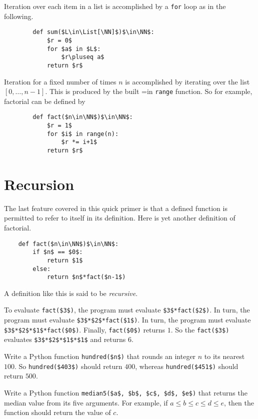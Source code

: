 Iteration over each item in a list is accomplished by a \lstinline|for| loop as in the following.

\begin{code}
	\begin{lstlisting}
		def sum($L\in\List[\NN]$)$\in\NN$:
			$r = 0$
			for $a$ in $L$:
				$r\pluseq a$
			return $r$ 
	\end{lstlisting}
\end{code}

Iteration for a fixed number of times $n$ is accomplished by iterating over the list $[0,\dotsc,n-1]$. This is produced by the built =in \lstinline|range| function. So for example, factorial can be defined by

\begin{code}
	\begin{lstlisting}
		def fact($n\in\NN$)$\in\NN$:
			$r = 1$
			for $i$ in range(n):
				$r *= i+1$
			return $r$ 
	\end{lstlisting}
\end{code}

\ipadbreak

\section{Recursion}

The last feature covered in this quick primer is that a defined function is permitted to refer to itself in its definition.  Here is yet another
definition of factorial.
\begin{code}
	\begin{lstlisting}
	def fact($n\in\NN$)$\in\NN$:
		if $n$ == $0$:
			return $1$
		else:
			return $n$*fact($n-1$)
	\end{lstlisting}
\end{code}
A definition like this is said to be \emph{recursive}. 

To evaluate \lstinline|fact($3$)|, the program must evaluate \lstinline|$3$*fact($2$)|.
In turn, the program must evaluate \lstinline|$3$*$2$*fact($1$)|. In turn, the program
must evaluate \lstinline|$3$*$2$*$1$*fact($0$)|. Finally, \lstinline|fact($0$)| 
returns $1$. So the \lstinline|fact($3$)| evaluates \lstinline|$3$*$2$*$1$*$1$|
and returns $6$.

\begin{exercises}
	\item   Write a Python function \lstinline|hundred($n$)| that rounds an integer $n$ to its nearest $100$.
	So \lstinline|hundred($403$)| should return $400$, whereas \lstinline|hundred($451$)| should return $500$.
	
	\item Write a Python function \lstinline|median5($a$, $b$, $c$, $d$, $e$)| that returns the median value
	from its five arguments. For example, if $a\leq b\leq c\leq d\leq e$, then the function should return the
	value of $c$.
\end{exercises}

